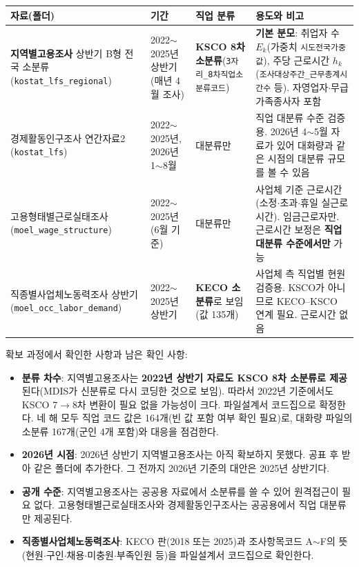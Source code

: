 \documentclass[11pt]{article}
\begin{document}
\begin{longtable}{L{3.3cm}L{2.6cm}L{3.0cm}L{6.9cm}}
\toprule
자료(폴더) & 기간 & 직업 분류 & 용도와 비고 \\
\midrule
\endhead
\textbf{지역별고용조사} 상반기 B형 전국 소분류 (\texttt{kostat\_lfs\_regional}) & 2022$\sim$2025년 상반기(매년 4월 조사) & \textbf{KSCO 8차 소분류}(\texttt{3자리\_8차직업소분류코드}) & \textbf{기본 분모}: 취업자 수 $E_k$(가중치 \texttt{시도전국가중값}), 주당 근로시간 $h_k$(\texttt{조사대상주간\_근무총계시간수} 등). 자영업자$\cdot$무급가족종사자 포함 \\
경제활동인구조사 연간자료2 (\texttt{kostat\_lfs}) & 2022$\sim$2025년, 2026년 1$\sim$8월 & 대분류만 & 직업 대분류 수준 검증용. 2026년 4$\sim$5월 자료가 있어 대화량과 같은 시점의 대분류 규모를 볼 수 있음 \\
고용형태별근로실태조사 (\texttt{moel\_wage\_structure}) & 2022$\sim$2025년(6월 기준) & 대분류만 & 사업체 기준 근로시간(소정$\cdot$초과$\cdot$휴일 실근로시간). 임금근로자만. 근로시간 보정은 \textbf{직업 대분류 수준에서만} 가능 \\
직종별사업체노동력조사 상반기 (\texttt{moel\_occ\_labor\_demand}) & 2022$\sim$2025년 상반기 & \textbf{KECO 소분류}로 보임(값 135개) & 사업체 측 직업별 현원 검증용. KSCO가 아니므로 KECO–KSCO 연계 필요. 근로시간 없음 \\
\bottomrule
\end{longtable}

확보 과정에서 확인한 사항과 남은 확인 사항:
\begin{itemize}[leftmargin=*]
  \item \textbf{분류 차수}: 지역별고용조사는 \textbf{2022년 상반기 자료도 KSCO 8차 소분류로 제공}된다(MDIS가 신분류로 다시 코딩한 것으로 보임). 따라서 2022년 기준에서도 KSCO 7$\to$8차 변환이 필요 없을 가능성이 크다. 파일설계서 코드집으로 확정한다. 네 해 모두 직업 코드 값은 164개(빈 값 포함 여부 확인 필요)로, 대화량 파일의 소분류 167개(군인 4개 포함)와 대응을 점검한다.
  \item \textbf{2026년 시점}: 2026년 상반기 지역별고용조사는 아직 확보하지 못했다. 공표 후 받아 같은 폴더에 추가한다. 그 전까지 2026년 기준의 대안은 2025년 상반기다.
  \item \textbf{공개 수준}: 지역별고용조사는 공공용 자료에서 소분류를 쓸 수 있어 원격접근이 필요 없다. 고용형태별근로실태조사와 경제활동인구조사는 공공용에서 직업 대분류만 제공된다.
  \item \textbf{직종별사업체노동력조사}: KECO 판(2018 또는 2025)과 조사항목코드 A$\sim$F의 뜻(현원$\cdot$구인$\cdot$채용$\cdot$미충원$\cdot$부족인원 등)을 파일설계서 코드집으로 확인한다.
\end{itemize}
\end{document}
